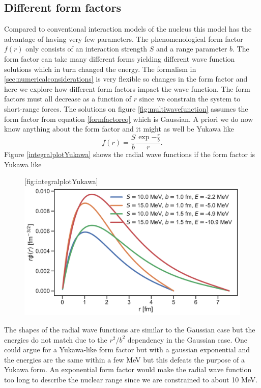 \subsection{Different form factors}
Compared to conventional interaction models of the nucleus this model has the advantage of having very few parameters. The phenomenological form factor $f(r)$ only consists of an interaction strength $S$ and a range parameter $b$. The form factor can take many different forms yielding different wave function solutions which in turn changed the energy. The formalism in \ref{sec:numericalconsiderations} is very flexible so changes in the form factor and here we explore how different form factors impact the wave function. The form factors must all decrease as a function of $r$ since we constrain the system to short-range forces. The solutions on figure \ref{fig:multiwavefunction} assumes the form factor from equation \ref{formfactoreq} which is Gaussian. A priori we do now know anything about the form factor and it might as well be Yukawa like
\begin{equation}
	f(r) = \frac{S}{b}\frac{\exp{-\frac{r}{b}}}{r}.
\end{equation}
Figure \ref{integralplotYukawa} shows the radial wave functions if the form factor is Yukawa like
\begin{figure}[H]
	\begin{sidecaption}{}[fig:integralplotYukawa]
		\includegraphics[width=\linewidth]{Figures/multiwavefunctionYukawa.pdf}
	\end{sidecaption}
\end{figure}
The shapes of the radial wave functions are similar to the Gaussian case but the energies do not match due to the $r^2/b^2$ dependency in the Gaussian case. One could argue for a Yukawa-like form factor but with a gaussian exponential and the energies are the same within a few MeV but this defeats the purpose of a Yukawa form. An exponential form factor would make the radial wave function too long to describe the nuclear range since we are constrained to about 10 MeV.  
